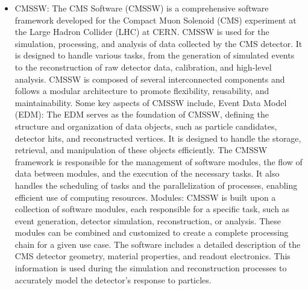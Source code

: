 \begin{itemize}

\item CMSSW: The CMS Software (CMSSW) is a comprehensive software framework developed for the Compact Muon Solenoid (CMS) experiment at the Large Hadron Collider (LHC) at CERN. CMSSW is used for the simulation, processing, and analysis of data collected by the CMS detector. It is designed to handle various tasks, from the generation of simulated events to the reconstruction of raw detector data, calibration, and high-level analysis. CMSSW is composed of several interconnected components and follows a modular architecture to promote flexibility, reusability, and maintainability. Some key aspects of CMSSW include, Event Data Model (EDM): The EDM serves as the foundation of CMSSW, defining the structure and organization of data objects, such as particle candidates, detector hits, and reconstructed vertices. It is designed to handle the storage, retrieval, and manipulation of these objects efficiently. The CMSSW framework is responsible for the management of software modules, the flow of data between modules, and the execution of the necessary tasks. It also handles the scheduling of tasks and the parallelization of processes, enabling efficient use of computing resources. Modules: CMSSW is built upon a collection of software modules, each responsible for a specific task, such as event generation, detector simulation, reconstruction, or analysis. These modules can be combined and customized to create a complete processing chain for a given use case. The software includes a detailed description of the CMS detector geometry, material properties, and readout electronics. This information is used during the simulation and reconstruction processes to accurately model the detector's response to particles. 

\end{itemize}
